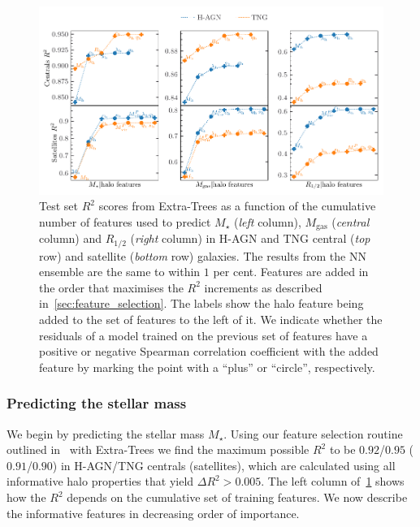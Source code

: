 \documentclass[useAMS,usenatbib]{mnras}
\begin{document}
\begin{figure}
    \centering
    \includegraphics[width=\textwidth]{Figures/galaxyR2s.pdf}
    \caption{
    Test set $R^2$ scores from Extra-Trees as a function of the cumulative number of features used to predict $M_\star$ (\emph{left} column),  $M_\mathrm{gas}$ (\emph{central} column) and $R_{1/2}$ (\emph{right} column) in H-AGN and TNG central (\emph{top} row) and satellite (\emph{bottom} row) galaxies. The results from the NN ensemble are the same to within $1$ per cent. Features are added in the order that maximises the $R^2$ increments as described in~\cref{sec:feature_selection}. The labels show the halo feature being added to the set of features to the left of it. We indicate whether the residuals of a model trained on the previous set of features have a positive or negative Spearman correlation coefficient with the added feature by marking the point with a ``plus'' or ``circle'', respectively.}
    \label{fig:halo2gal_R2}
\end{figure}

\subsubsection{Predicting the stellar mass}\label{sec:mstar_pred}

We begin by predicting the stellar mass $M_\star$. Using our feature selection routine outlined in~ with Extra-Trees we find the maximum possible
$R^2$ to be $0.92$/$0.95$ ($0.91$/$0.90$) in H-AGN/TNG centrals (satellites), which are calculated using all informative halo properties that yield $\Delta R^2 > 0.005$. The left column of~\cref{fig:halo2gal_R2} shows how the $R^2$ depends on the cumulative set of training features. We now describe the informative features in decreasing order of importance.
\end{document}
